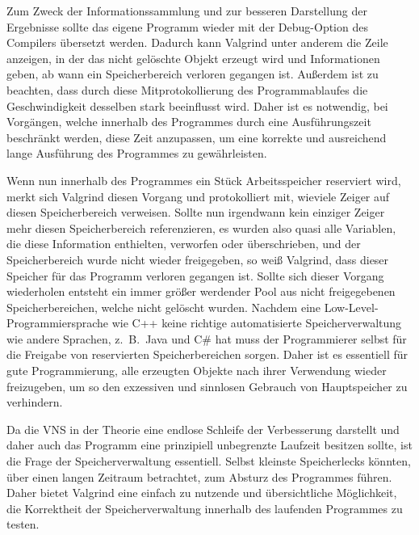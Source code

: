 Zum Zweck der Informationssammlung und zur besseren Darstellung der Ergebnisse sollte das eigene Programm wieder mit der Debug-Option des Compilers übersetzt werden. Dadurch kann Valgrind unter anderem die Zeile
anzeigen, in der das nicht gelöschte Objekt erzeugt wird und Informationen geben, ab wann ein Speicherbereich verloren gegangen ist. Außerdem ist zu beachten, dass durch diese Mitprotokollierung des 
Programmablaufes die Geschwindigkeit desselben stark beeinflusst wird. Daher ist es notwendig, bei Vorgängen, welche innerhalb des Programmes durch eine Ausführungszeit beschränkt werden, diese Zeit anzupassen, 
um eine korrekte und ausreichend lange Ausführung des Programmes zu gewährleisten. 

Wenn nun innerhalb des Programmes ein Stück Arbeitsspeicher reserviert wird, merkt sich Valgrind diesen Vorgang und protokolliert mit, wieviele Zeiger auf diesen Speicherbereich verweisen. Sollte nun irgendwann
kein einziger Zeiger mehr diesen Speicherbereich referenzieren, es wurden also quasi alle Variablen, die diese Information enthielten, verworfen oder überschrieben, und der Speicherbereich wurde nicht wieder
freigegeben, so weiß Valgrind, dass dieser Speicher für das Programm verloren gegangen ist. Sollte sich dieser Vorgang wiederholen entsteht ein immer größer werdender Pool aus nicht freigegebenen Speicherbereichen, welche
nicht gelöscht wurden. Nachdem eine Low-Level-Programmiersprache wie C++ keine richtige automatisierte Speicherverwaltung wie andere Sprachen, z.~B.\ Java und C\# hat muss der Programmierer selbst für die 
Freigabe von reservierten Speicherbereichen sorgen. Daher ist es essentiell für gute Programmierung, alle erzeugten Objekte nach ihrer Verwendung wieder freizugeben, um so den exzessiven und sinnlosen Gebrauch von
Hauptspeicher zu verhindern.

\singlespacing


Da die VNS in der Theorie eine endlose Schleife der Verbesserung darstellt und daher auch das Programm eine prinzipiell unbegrenzte Laufzeit besitzen sollte, ist die Frage der Spei\-cher\-ver\-walt\-ung essentiell.
Selbst kleinste Speicherlecks könnten, über einen langen Zeitraum betrachtet, zum Absturz des Programmes führen. Daher bietet Valgrind eine einfach zu nutzende und übersichtliche Möglichkeit, die Korrektheit
der Speicherverwaltung innerhalb des laufenden Programmes zu testen. 

